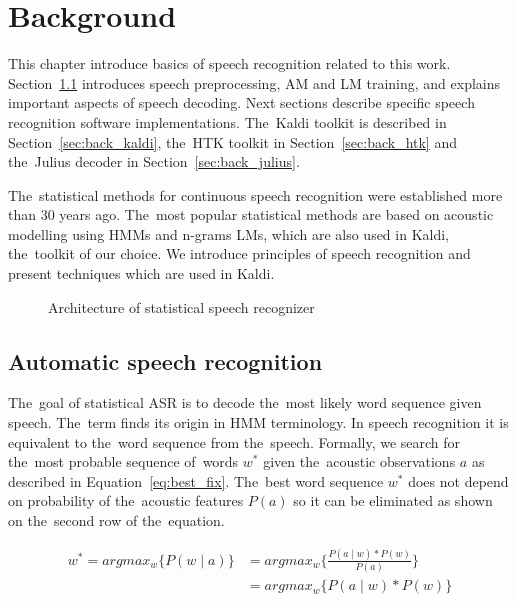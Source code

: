 \chapter{Background}
\label{cha:background}
This chapter introduce basics of speech recognition related to this work.
Section~\ref{sec:back_asr} introduces speech preprocessing, \acf{AM} and \acf{LM} training, and explains important aspects of speech decoding.
Next sections describe specific speech recognition software implementations.
The~Kaldi toolkit is described in Section~\ref{sec:back_kaldi}, the~\ac{HTK} toolkit in Section~\ref{sec:back_htk} and the~Julius decoder in Section~\ref{sec:back_julius}.

The~statistical methods for continuous speech recognition were established more than 30 years ago. 
The~most popular statistical methods are based on acoustic modelling using \acp{HMM} and n-grams \acp{LM}, which are also used in Kaldi, the~toolkit of our choice.
We introduce principles of speech recognition and present techniques which are used in Kaldi. 

\begin{figure}[!htp]
    \begin{center}
    
    \caption{Architecture of statistical speech recognizer\cite{ney1990acoustic}}
    \label{fig:components} 
    \end{center}
\end{figure}

\section{Automatic speech recognition}
\label{sec:back_asr}

The~goal of statistical \ac{ASR} is to decode the~most likely word sequence given speech.
The~term  finds its origin in \acs{HMM} terminology. 
In speech recognition it is equivalent to  the~word sequence from the~speech. 
Formally, we search for the~most probable sequence of~words $w^*$ given the~acoustic observations $a$ as described in Equation~\ref{eq:best_fix}.
The~best word sequence $w^*$ does not depend on probability of the~acoustic features $P(a)$ so it can be eliminated as shown on the~second row of the~equation.

\begin{equation}\label{eq:best_fix}
    \begin{split}
    w^* = argmax_{w}\{P(w \mid a)\} &= argmax_{w}\{\frac{P(a \mid w) * P(w)}{P(a)}\} \\
                                    &= argmax_{w}\{P(a \mid w) * P(w)\}
    \end{split}
\end{equation}

